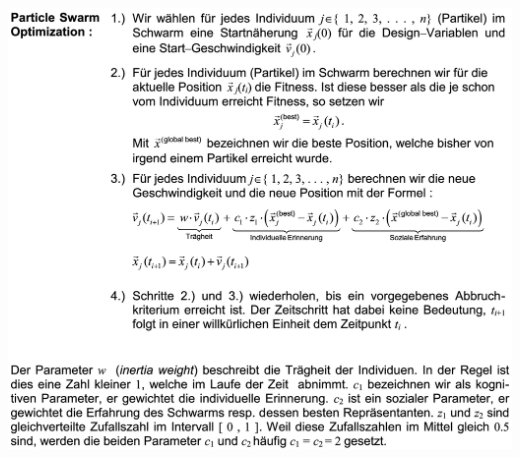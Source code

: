   \begin{center}
  \includegraphics[width=0.7\linewidth]{./Content/MetaHeuristics/partSwarm}
  \end{center}
  
  
  

